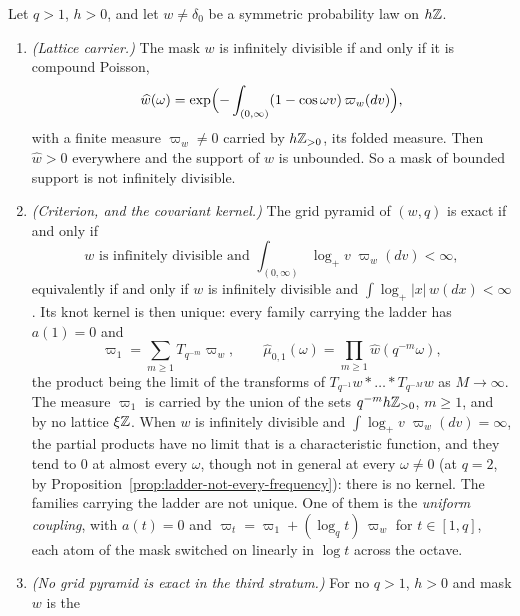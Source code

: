 \begin{proposition}
\label{prop:grid-pyramids-infinitely-divisible}

Let $q > 1$, $h > 0$, and let $w \ne \delta_0$ be a symmetric probability law on $h\mathbb{Z}$.
\begin{enumerate}
\item \emph{(Lattice carrier.)} The mask $w$ is infinitely divisible if and only if it is compound
Poisson,
\[
  \widehat w(\omega) = \exp\Bigl(-\int_{(0,\infty)}(1 - \cos\omega v)\,\varpi_w(dv)\Bigr),
\]
with a finite measure $\varpi_w \ne 0$ carried by $h\mathbb{Z}_{>0}$, its folded \Levy{} measure. Then
$\widehat w > 0$ everywhere and the support of $w$ is unbounded. So a mask of bounded support is
not infinitely divisible.
\item \emph{(Criterion, and the covariant kernel.)} The grid pyramid of $(w, q)$ is exact if
and only if
\begin{equation}
\label{eq:grid-pyramid-criterion}
  w \text{ is infinitely divisible and } \int_{(0,\infty)}\log_+v\;\varpi_w(dv) < \infty ,
\end{equation}
equivalently if and only if $w$ is infinitely divisible and $\int\log_+|x|\,w(dx) < \infty$. Its
knot kernel is then unique: every family carrying the ladder has $a(1) = 0$ and
\begin{equation}
\label{eq:grid-pyramid-knot-kernel}
  \varpi_1 = \sum_{m \ge 1}T_{q^{-m}}\varpi_w, \qquad
  \widehat\mu_{0,1}(\omega) = \prod_{m \ge 1}\widehat w(q^{-m}\omega),
\end{equation}
the product being the limit of the transforms of $T_{q^{-1}}w * \dots * T_{q^{-M}}w$ as
$M \to \infty$. The measure $\varpi_1$ is carried by the union of the sets $q^{-m}h\mathbb{Z}_{>0}$,
$m \ge 1$, and by no lattice $\xi\mathbb{Z}$. When $w$ is infinitely divisible and
$\int\log_+v\;\varpi_w(dv) = \infty$, the partial products
have no limit that is a characteristic function, and they tend to $0$ at almost every $\omega$,
though not in general at every $\omega \ne 0$ (at $q = 2$, by
Proposition~\ref{prop:ladder-not-every-frequency}): there is no kernel. The families carrying the ladder
are not unique. One of them is the \emph{uniform coupling}, with $a(t) = 0$ and
$\varpi_t = \varpi_1 + (\log_qt)\,\varpi_w$ for $t \in [1,q]$, each atom of the mask switched on
linearly in $\log t$ across the octave.
\item \emph{(No grid pyramid is exact in the third stratum.)} For no $q > 1$, $h > 0$ and mask $w$ is the

\end{enumerate}
\end{proposition}
